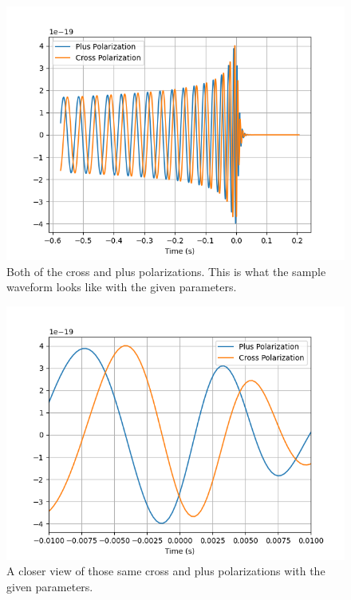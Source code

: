 \documentclass[]{article}
\begin{document}
\begin{figure}[H]
	\begin{center}
		\includegraphics[scale=1]{HPHC.png}
	\end{center}
	\caption{Both of the cross and plus polarizations. This is what the sample waveform looks like with the given parameters.}
	\label{fig:HPHC}
\end{figure}

\begin{figure}[H]
	\begin{center}
		\includegraphics[scale=1]{HPHCClose.png}
	\end{center}
	\caption{A closer view of those same cross and plus polarizations with the given parameters.}
	\label{fig:HPHCClose}
\end{figure}
\end{document}
